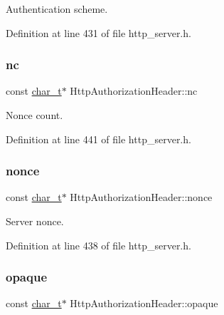 Authentication scheme. 



Definition at line 431 of file http\+\_\+server.\+h.

\mbox{\label{structHttpAuthorizationHeader_a7ecc070d92b64c544a5a3d036a3ff2d6}} 
\subsubsection{\texorpdfstring{nc}{nc}}
{\footnotesize\ttfamily const \hyperlink{compiler__port_8h_a40bb5262bf908c328fbcfbe5d29d0201}{char\+\_\+t}$\ast$ Http\+Authorization\+Header\+::nc}



Nonce count. 



Definition at line 441 of file http\+\_\+server.\+h.

\mbox{\label{structHttpAuthorizationHeader_ad414b477649a2aab5094559a281786b3}} 
\subsubsection{\texorpdfstring{nonce}{nonce}}
{\footnotesize\ttfamily const \hyperlink{compiler__port_8h_a40bb5262bf908c328fbcfbe5d29d0201}{char\+\_\+t}$\ast$ Http\+Authorization\+Header\+::nonce}



Server nonce. 



Definition at line 438 of file http\+\_\+server.\+h.

\mbox{\label{structHttpAuthorizationHeader_a3019021c840376ab709b7f342a10f069}} 
\subsubsection{\texorpdfstring{opaque}{opaque}}
{\footnotesize\ttfamily const \hyperlink{compiler__port_8h_a40bb5262bf908c328fbcfbe5d29d0201}{char\+\_\+t}$\ast$ Http\+Authorization\+Header\+::opaque}



